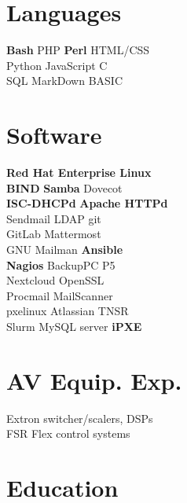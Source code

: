 \documentclass[letterpaper]{deedy-resume-openfont}
\begin{document}



\begin{minipage}[t]{0.27\textwidth}
\section{Languages}
\textbf{Bash} \textbullet{} PHP \textbullet{} \textbf{Perl} \textbullet{} HTML/CSS \\
Python \textbullet{} JavaScript \textbullet{} C \\
SQL \textbullet{} MarkDown \textbullet{} BASIC

\section{Software}
\textbf{Red Hat Enterprise Linux} \\
\textbf{BIND} \textbullet{} \textbf{Samba} \textbullet{} Dovecot \\
\textbf{ISC-DHCPd} \textbullet{} \textbf{Apache HTTPd} \\
Sendmail \textbullet{} LDAP \textbullet{} git \\
GitLab \textbullet{}  Mattermost \\
GNU Mailman \textbullet{} \textbf{Ansible} \\
\textbf{Nagios} \textbullet{} BackupPC \textbullet{} P5 \\
Nextcloud \textbullet{} OpenSSL \\
Procmail \textbullet{} MailScanner \\
pxelinux \textbullet{} Atlassian \textbullet{} TNSR \\
Slurm \textbullet{}
MySQL server \textbullet{} \textbf{iPXE}


\section{AV Equip. Exp.}
Extron switcher/scalers, DSPs \\
FSR Flex control systems


\section{Education}

\end{minipage}
\end{document}
